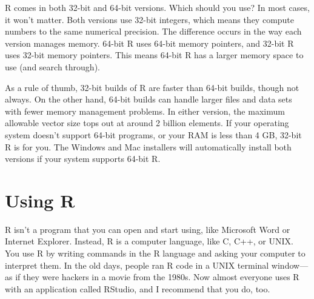 \documentclass[
  letterpaper,
  DIV=11,
  numbers=noendperiod]{scrbook}
\begin{document}
\begin{tcolorbox}[enhanced jigsaw, breakable, colback=white, colbacktitle=quarto-callout-note-color!10!white, arc=.35mm, bottomrule=.15mm, coltitle=black, left=2mm, rightrule=.15mm, colframe=quarto-callout-note-color-frame, leftrule=.75mm, opacitybacktitle=0.6, bottomtitle=1mm, toptitle=1mm, titlerule=0mm, opacityback=0, title=\textcolor{quarto-callout-note-color}{\faInfo}\hspace{0.5em}{32-bit Versus 64-bit}, toprule=.15mm]

R comes in both 32-bit and 64-bit versions. Which should you use? In
most cases, it won't matter. Both versions use 32-bit integers, which
means they compute numbers to the same numerical precision. The
difference occurs in the way each version manages memory. 64-bit R uses
64-bit memory pointers, and 32-bit R uses 32-bit memory pointers. This
means 64-bit R has a larger memory space to use (and search through).

As a rule of thumb, 32-bit builds of R are faster than 64-bit builds,
though not always. On the other hand, 64-bit builds can handle larger
files and data sets with fewer memory management problems. In either
version, the maximum allowable vector size tops out at around 2 billion
elements. If your operating system doesn't support 64-bit programs, or
your RAM is less than 4 GB, 32-bit R is for you. The Windows and Mac
installers will automatically install both versions if your system
supports 64-bit R.

\end{tcolorbox}

\section{Using R}\label{using-r}

R isn't a program that you can open and start using, like Microsoft Word
or Internet Explorer. Instead, R is a computer language, like C, C++, or
UNIX. You use R by writing commands in the R language and asking your
computer to interpret them. In the old days, people ran R code in a UNIX
terminal window---as if they were hackers in a movie from the 1980s. Now
almost everyone uses R with an application called RStudio, and I
recommend that you do, too.
\end{document}
